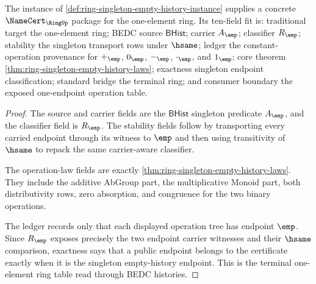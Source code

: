 \begin{theorem}
\label{thm:ring-singleton-empty-history-namecert}
The instance of \autoref{def:ring-singleton-empty-history-instance} supplies a
concrete $\NameCert_{\RingUp}$ package for the one-element ring. Its ten-field
fit is: traditional target the one-element ring; BEDC source
$\mathsf{BHist}$; carrier $A_{\emp}$; classifier $R_{\emp}$; stability the
singleton transport rows under $\hsame$; ledger the constant-operation
provenance for $+_{\emp}$, $0_{\emp}$, $-_{\emp}$, $\cdot_{\emp}$, and
$1_{\emp}$; core theorem \autoref{thm:ring-singleton-empty-history-laws};
exactness singleton endpoint classification; standard bridge the terminal
ring; and consumer boundary the exposed one-endpoint operation table.
\end{theorem}
\begin{proof}
The source and carrier fields are the $\mathsf{BHist}$ singleton predicate
$A_{\emp}$, and the classifier field is $R_{\emp}$. The stability fields follow
by transporting every carried endpoint through its witness to $\emp$ and then
using transitivity of $\hsame$ to repack the same carrier-aware classifier.

The operation-law fields are exactly
\autoref{thm:ring-singleton-empty-history-laws}. They include the additive
AbGroup part, the multiplicative Monoid part, both distributivity rows, zero
absorption, and congruence for the two binary operations.

The ledger records only that each displayed operation tree has endpoint
$\emp$. Since $R_{\emp}$ exposes precisely the two endpoint carrier witnesses
and their $\hsame$ comparison, exactness says that a public endpoint belongs to
the certificate exactly when it is the singleton empty-history endpoint. This
is the terminal one-element ring table read through BEDC histories.
\end{proof}
